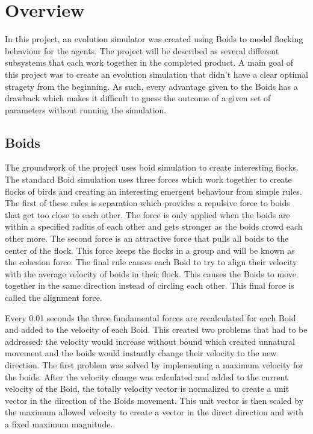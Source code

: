 \documentclass{egpubl}
\begin{document}
\section{Overview}
In this project, an evolution simulator was created using Boids to model flocking behaviour for the agents. The project will be described as several different subsystems that each work together in the completed product. A main goal of this project was to create an evolution simulation that didn't have a clear optimal stragety from the beginning. As such, every advantage given to the Boids has a drawback which makes it difficult to guess the outcome of a given set of parameters without running the simulation.
\subsection{Boids}
\label{forces}
The groundwork of the project uses boid simulation to create interesting flocks. The standard Boid simulation uses three forces which work together to create flocks of birds and creating an interesting emergent behaviour from simple rules. The first of these rules is separation which provides a repulsive force to boids that get too close to each other. The force is only applied when the boids are within a specified radius of each other and gets stronger as the boids crowd each other more. The second force is an attractive force that pulls all boids to the center of the flock. This force keeps the flocks in a group and will be known as the cohesion force. The final rule causes each Boid to try to align their velocity with the average velocity of boids in their flock. This causes the Boids to move together in the same direction instead of circling each other. This final force is called the alignment force.
\par
Every 0.01 seconds the three fundamental forces are recalculated for each Boid and added to the velocity of each Boid. This created two problems that had to be addressed: the velocity would increase without bound which created unnatural movement and the boids would instantly change their velocity to the new direction. The first problem was solved by implementing a maximum velocity for the boids. After the velocity change was calculated and added to the current velocity of the Boid, the totally velocity vector is normalized to create a unit vector in the direction of the Boids movement. This unit vector is then scaled by the maximum allowed velocity to create a vector in the direct direction and with a fixed maximum magnitude. 
\par
\end{document}
